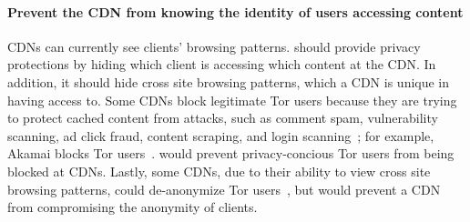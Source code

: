 \paragraph{Prevent the CDN from knowing the identity of users accessing content} CDNs can currently see clients' 
browsing patterns. \system{} should provide privacy protections by hiding which client is accessing 
which content at the CDN.  In addition, it should hide cross site browsing patterns, which a CDN 
is unique in having access to.  Some CDNs block legitimate Tor users because they are 
trying to protect cached content from attacks, such as comment spam, vulnerability scanning, 
ad click fraud, content scraping, and login scanning~\cite{ars_tor}; for example, Akamai blocks Tor users~\cite{khattak2016you}.    \system{} would prevent 
privacy-concious Tor users from being blocked at CDNs.  Lastly, some CDNs, due to their ability 
to view cross site browsing patterns, could de-anonymize Tor users~\cite{cloudflare_tor}, but \system{} would 
prevent a CDN from compromising the anonymity of clients.




